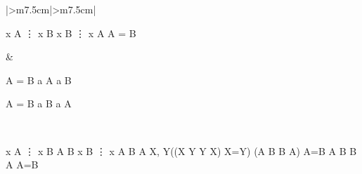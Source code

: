 \documentclass[10pt,a4paper]{book}
\begin{document}
\begin{tabular}{|>{\centering\arraybackslash}m{7.5cm}|>{\centering\arraybackslash}m{7.5cm}|}
    \hline
    \begin{fitchproof}[arrayenv=tabular]
        \open
         {x \in A }
         {\vdots}
         {x \in B}
        \close
        \open
         {x \in B}
         {\vdots}
         {x \in A}
        \close
         {\therefore A = B } 
    \end{fitchproof}
    \rule[0pt]{0pt}{0pt} &
    \begin{minipage}[t]{\linewidth}
        \centering
        \begin{minipage}[t]{0.48\linewidth}
            \begin{fitchproof}[arrayenv=tabular]
                 {A = B }
                 {a \in A }
                 {\therefore  a \in B } 
            \end{fitchproof}
        \end{minipage}
        \begin{minipage}[t]{0.48\linewidth}
            \begin{fitchproof}[arrayenv=tabular]
                 {A = B }
                 { a \in B}
                 { \therefore  a \in A} 
            \end{fitchproof}
        \end{minipage}
    \end{minipage}
    \\
    \hline
\end{tabular}

\begin{fitchproof}[arrayenv=tabular]
    \open
     {x \in A }                                                                 
     {\vdots}
     {x \in B}
    \close
     {A \subseteq B }                                                        
    \open
     {x \in B}                                                                
     {\vdots}
     {x \in A}
    \close
     {B \subseteq A }                                                          
     {\forall X, Y((X \subseteq Y \wedge Y \subseteq X) \rightarrow X=Y)}   
     {(A \subseteq B \wedge B \subseteq A) \rightarrow A=B}                 
     {A \subseteq B \wedge B \subseteq A}                                       
     {A=B}                                                                        
\end{fitchproof}
\end{document}
